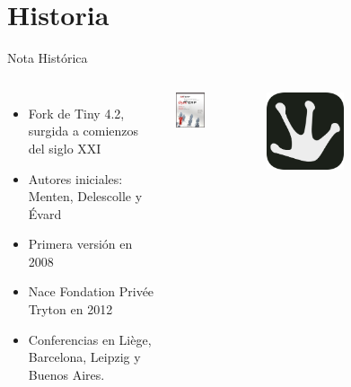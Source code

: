 

\section{Historia}

	\begin{frame}{Nota Histórica}
	\fontsize{11}{11}\selectfont
        \begin{columns}
            \vspace*{-5mm}
			\begin{itemize}
				\item Fork de Tiny 4.2, surgida a comienzos del siglo XXI
				\item Autores iniciales: Menten, Delescolle y Évard
				\item Primera versión en 2008	
				\item Nace Fondation Privée Tryton en 2012
				\item Conferencias en Liège, Barcelona, Leipzig y Buenos Aires.
			\end{itemize}
            \vspace*{-0.5cm}
            \begin{center}
            \includegraphics[width=0.4\textwidth]{./Images/tinyERP.jpg}
            \end{center}
            \begin{center}
            \includegraphics[width=0.4\textwidth]{./Images/Logos/tryton-logo-2.png}
            \end{center}
        \end{columns}


    \end{frame}
